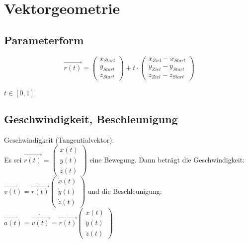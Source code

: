 



\chapter{Vektorgeometrie}

\section{Parameterform}
\[\overrightarrow{r(t)}=
\begin{pmatrix}
 	x_{Start}\\
	y_{Start}\\
	z_{Start}
\end{pmatrix}
+
t\cdot
\begin{pmatrix}
 	x_{Ziel}-x_{Start}\\
	y_{Ziel}-y_{Start}\\
	z_{Ziel}-z_{Start}
\end{pmatrix}
\]
\\
$t\in[0,1]$

\section{Geschwindigkeit, Beschleunigung}
Geschwindigkeit (Tangentialvektor):
\\
Es sei $\overrightarrow{r(t)}=
\begin{pmatrix}
 	x(t)\\
	y(t)\\
	z(t)
\end{pmatrix}$ eine Bewegung. Dann beträgt die Geschwindigkeit:
 $\overrightarrow{v(t)}=\dot{\overrightarrow{r(t)}}
\begin{pmatrix}
 	\dot{x}(t)\\
	\dot{y}(t)\\
	\dot{z}(t)
\end{pmatrix}$
und die Beschleunigung:
 $\overrightarrow{a(t)}=\dot{\overrightarrow{v(t)}}=\ddot{\overrightarrow{r(t)}}
\begin{pmatrix}
 	\ddot{x}(t)\\
	\ddot{y}(t)\\
	\ddot{z}(t)
\end{pmatrix}$
\\
